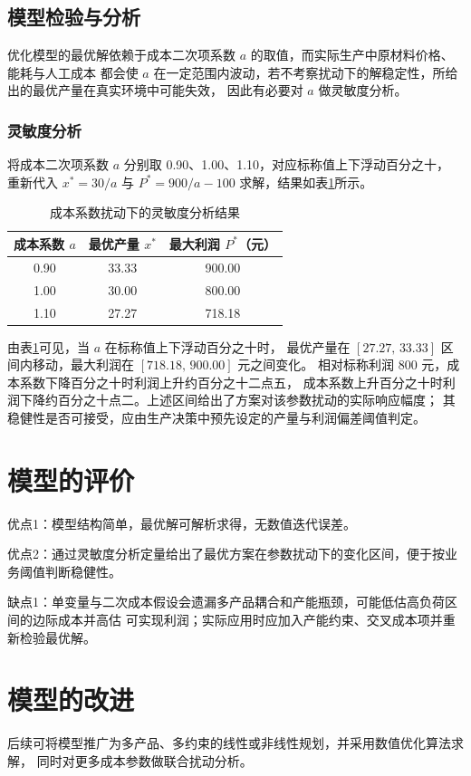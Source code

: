 \documentclass[11pt]{article}
\begin{document}
\subsection{模型检验与分析}
优化模型的最优解依赖于成本二次项系数 $a$ 的取值，而实际生产中原材料价格、能耗与人工成本
都会使 $a$ 在一定范围内波动，若不考察扰动下的解稳定性，所给出的最优产量在真实环境中可能失效，
因此有必要对 $a$ 做灵敏度分析。

\subsubsection{灵敏度分析}
将成本二次项系数 $a$ 分别取 0.90、1.00、1.10，对应标称值上下浮动百分之十，
重新代入 $x^{*}=30/a$ 与 $P^{*}=900/a-100$ 求解，结果如表\ref{tab:sen}所示。

\begin{table}[htbp]
  \centering
  \caption{成本系数扰动下的灵敏度分析结果}
  \label{tab:sen}
  \begin{tabular}{ccc}
    \toprule
    成本系数 $a$ & 最优产量 $x^{*}$ & 最大利润 $P^{*}$（元） \\
    \midrule
    0.90 & 33.33 & 900.00 \\
    1.00 & 30.00 & 800.00 \\
    1.10 & 27.27 & 718.18 \\
    \bottomrule
  \end{tabular}
\end{table}

由表\ref{tab:sen}可见，当 $a$ 在标称值上下浮动百分之十时，
最优产量在 $[27.27,\,33.33]$ 区间内移动，最大利润在 $[718.18,\,900.00]$ 元之间变化。
相对标称利润 800 元，成本系数下降百分之十时利润上升约百分之十二点五，
成本系数上升百分之十时利润下降约百分之十点二。上述区间给出了方案对该参数扰动的实际响应幅度；
其稳健性是否可接受，应由生产决策中预先设定的产量与利润偏差阈值判定。

\section{模型的评价}
优点1：模型结构简单，最优解可解析求得，无数值迭代误差。

优点2：通过灵敏度分析定量给出了最优方案在参数扰动下的变化区间，便于按业务阈值判断稳健性。

缺点1：单变量与二次成本假设会遗漏多产品耦合和产能瓶颈，可能低估高负荷区间的边际成本并高估
可实现利润；实际应用时应加入产能约束、交叉成本项并重新检验最优解。

\section{模型的改进}
后续可将模型推广为多产品、多约束的线性或非线性规划，并采用数值优化算法求解，
同时对更多成本参数做联合扰动分析。
\end{document}
